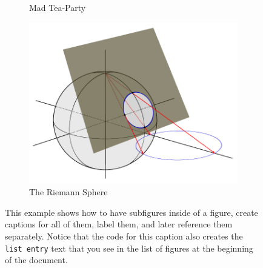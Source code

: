 \documentclass{article}
\begin{document}
\begin{figure}[b]
\begin{subfigure}{0.35\textwidth}
\caption{Mad Tea-Party}
\label{subfig:teaparty}
\end{subfigure}
\quad
\begin{subfigure}{0.35\textwidth}
\includegraphics[width=\textwidth]{RiemannSphereCircle}
\caption{The Riemann Sphere}
\label{subfig:sphere}
\end{subfigure}
\caption[A figure with subfigures]{This example shows how to have subfigures inside of a figure, create captions for all of them, label them, and later reference them separately. Notice that the code for this caption also creates the \texttt{list entry} text that you see in the list of figures at the beginning of the document.}
\label{fig:threepics}
\end{figure}
\end{document}
